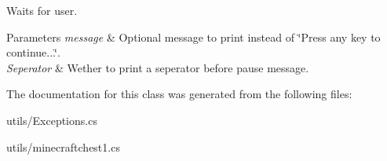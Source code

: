 Waits for user. 


\begin{DoxyParams}{Parameters}
{\em message} & Optional message to print instead of \char`\"{}\+Press any key to continue...\char`\"{}. \\
\hline
{\em Seperator} & Wether to print a seperator before pause message. \\
\hline
\end{DoxyParams}


The documentation for this class was generated from the following files\+:\begin{DoxyCompactItemize}
\item 
utils/Exceptions.\+cs\item 
utils/minecraftchest1.\+cs\end{DoxyCompactItemize}

